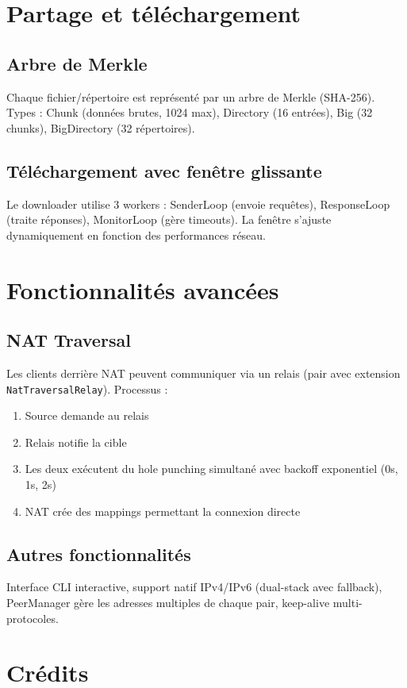 \documentclass[11pt,a4paper]{report}
\begin{document}
\section{Partage et téléchargement}

\subsection{Arbre de Merkle}
Chaque fichier/répertoire est représenté par un arbre de Merkle (SHA-256). Types : Chunk (données brutes, 1024 max), Directory (16 entrées), Big (32 chunks), BigDirectory (32 répertoires).

\subsection{Téléchargement avec fenêtre glissante}
Le downloader utilise 3 workers : SenderLoop (envoie requêtes), ResponseLoop (traite réponses), MonitorLoop (gère timeouts). La fenêtre s'ajuste dynamiquement en fonction des performances réseau.

\section{Fonctionnalités avancées}

\subsection{NAT Traversal}
Les clients derrière NAT peuvent communiquer via un relais (pair avec extension \texttt{NatTraversalRelay}). Processus : 
\begin{enumerate}
    \item Source demande au relais
    \item Relais notifie la cible
    \item Les deux exécutent du hole punching simultané avec backoff exponentiel (0s, 1s, 2s)
    \item NAT crée des mappings permettant la connexion directe
\end{enumerate}

\subsection{Autres fonctionnalités}
Interface CLI interactive, support natif IPv4/IPv6 (dual-stack avec fallback), PeerManager gère les adresses multiples de chaque pair, keep-alive multi-protocoles.

\section*{Crédits}
\end{document}
